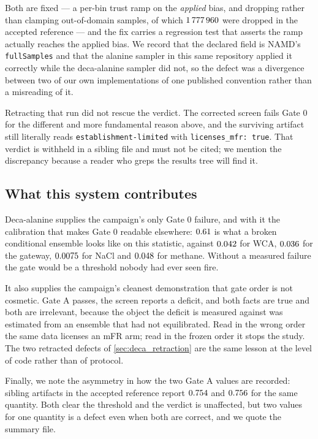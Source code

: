 Both are fixed --- a per-bin trust ramp on the \emph{applied} bias, and dropping rather than
clamping out-of-domain samples, of which $1\,777\,960$ were dropped in the accepted reference
--- and the fix carries a regression test that asserts the ramp actually reaches the applied
bias. We record that the declared field is NAMD's \texttt{fullSamples} and that the alanine
sampler in this same repository applied it correctly while the deca-alanine sampler did not, so
the defect was a divergence between two of our own implementations of one published convention
rather than a misreading of it.

Retracting that run did not rescue the verdict. The corrected screen fails Gate 0 for the
different and more fundamental reason above, and the surviving artifact still literally reads
\texttt{establishment-limited} with \texttt{licenses\_mfr: true}. That verdict is withheld in a
sibling file and must not be cited; we mention the discrepancy because a reader who greps the
results tree will find it.

\subsection{What this system contributes}

Deca-alanine supplies the campaign's only Gate 0 failure, and with it the calibration that makes
Gate 0 readable elsewhere: $0.61$ is what a broken conditional ensemble looks like on this
statistic, against $0.042$ for WCA, $0.036$ for the gateway, $0.0075$ for NaCl
and $0.048$ for methane. Without a measured failure the gate would be a threshold
nobody had ever seen fire.

It also supplies the campaign's cleanest demonstration that gate order is not cosmetic. Gate A
passes, the screen reports a deficit, and both facts are true and both are irrelevant, because
the object the deficit is measured against was estimated from an ensemble that had not
equilibrated. Read in the wrong order the same data licenses an mFR arm; read in the frozen order
it stops the study. The two retracted defects of \cref{sec:deca_retraction} are the same lesson
at the level of code rather than of protocol.

Finally, we note the asymmetry in how the two Gate A values are recorded: sibling artifacts in
the accepted reference report $0.754$ and $0.756$ for the same quantity. Both clear
the threshold and the verdict is unaffected, but two values for one quantity is a defect even
when both are correct, and we quote the summary file.
